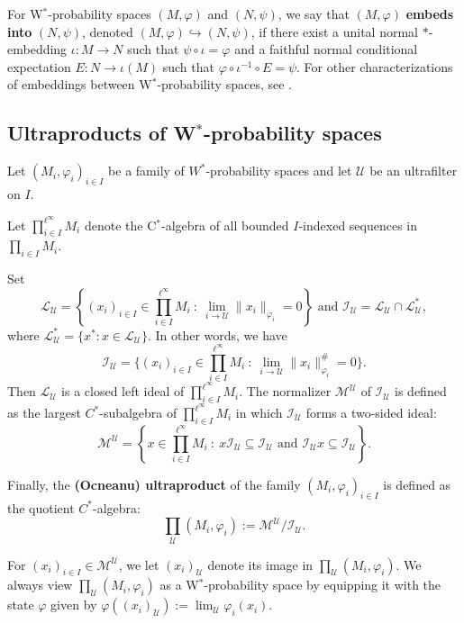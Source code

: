 \documentclass[12pt]{amsart}
\theoremstyle{definition}
\def\cal{\mathcal}
\def\u{\mathsf 1}
\newcommand\cU{{\cal U}}
\def \u{\mathcal U}
\begin{document}
For W$^*$-probability spaces $(M, \varphi)$ and $(N, \psi)$, we say that $(M, \varphi)$ \textbf{embeds into} $(N, \psi)$, denoted $(M, \varphi) \hookrightarrow (N, \psi)$, if there exist a unital normal $\ast$-embedding $\iota : M \to N$ such that $\psi \circ \iota = \varphi$ and a faithful normal conditional expectation $E : N \to \iota(M)$ such that $\varphi \circ \iota^{-1} \circ E = \psi$.  For other characterizations of embeddings between W$^*$-probability spaces, see \cite[Lemma 2.8]{AGHS25}.

\subsection{Ultraproducts of W$^*$-probability spaces}\label{subsec ultraproducts}
Let $(M_i, \varphi_i)_{i \in I}$ be a family of $W^*$-probability spaces and let $\cU$ be an ultrafilter on $I$. 

Let $\prod_{i\in I}^{\ell^{\infty}}M_i$ denote the C$^*$-algebra of all bounded $I$-indexed sequences in $\prod_{i\in I}M_i$. 

Set 
\[\mathcal{L}_{\cU}=\left \{(x_i)_{i\in I}\in \prod_{i\in I}^{\ell^{\infty}}M_i \ : \ \lim_{i\to \cU}\|x_i\|_{\varphi_i}=0\right \} \text{ and }\mathcal{I}_{\cU}=\mathcal{L}_{\cU}\cap \mathcal{L}_{\cU}^*,\]
where $\mathcal{L}_{\cU}^*=\{x^* : x\in \mathcal{L}_{\cU}\}$. 
In other words, we have $$\mathcal{I}_{\cU}=\{(x_i)_{i\in I}\in \prod_{i\in I}^{\ell^\infty}M_i \ : \ \lim_{i\to \u}\|x_i\|_{\varphi_i}^\#=0\}.$$  Then $\mathcal{L}_{\cU}$ is a closed left ideal of $\prod_{i\in I}^{\ell^{\infty}}M_i$.  The normalizer $\mathcal{M}^{\cU}$ of $\mathcal{I}_{\cU}$ is defined as the largest $C^*$-subalgebra of $\prod_{i\in I}^{\ell^{\infty}}M_i$ in which $\mathcal{I}_{\cU}$ forms a two-sided ideal:
$$\mathcal{M}^{\cU} = \left\{ x \in {\prod_{i\in I}^{\ell^{\infty}}M_i}  \ : \  x \mathcal{I}_{\cU} \subseteq \mathcal{I}_{\cU} \text{ and } \mathcal{I}_{\cU} x \subseteq \mathcal{I}_{\cU} \right\}.$$

Finally, the \textbf{(Ocneanu) ultraproduct} of the family $(M_i, \varphi_i)_{i \in I}$ is defined as the quotient $C^*$-algebra:
$$\prod_{\cU}(M_i, \varphi_i) := \mathcal{M}^{\cU} / \mathcal{I}_{\cU}.$$

For $(x_i)_{i\in I} \in \mathcal{M}^{\cU}$, we let $(x_i)_\u$ denote its image in $\prod_\u (M_i,\varphi_i)$.  We always view $\prod_\u (M_i,\varphi_i)$ as a W$^*$-probability space by equipping it with the state $\varphi$ given by $\varphi((x_i)_\u):=\lim_\u \varphi_i(x_i)$.
\end{document}
